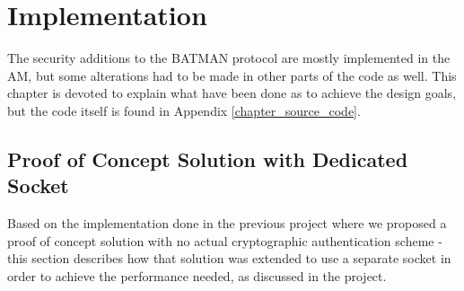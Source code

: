 \chapter{Implementation}

The security additions to the BATMAN protocol are mostly implemented in the
\ac{AM}, but some alterations had to be made in other parts of the code as well.
This chapter is devoted to explain what have been done as to achieve the design
goals, but the code itself is found in Appendix \ref{chapter_source_code}.

\section{Proof of Concept Solution with Dedicated Socket}
Based on the implementation done in the previous project where we proposed a
proof of concept solution with no actual cryptographic authentication scheme -
this section describes how that solution was extended to use a separate socket
in order to achieve the performance needed, as discussed in the project.
